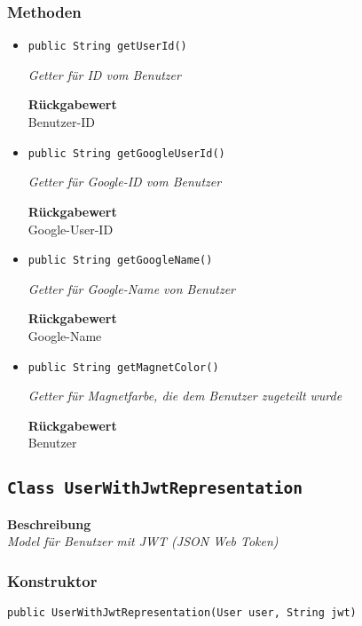     \subsubsection{Methoden}
    \begin{itemize}
    	\item{\texttt{public String getUserId()}}
    	
    	\textit{Getter für ID vom Benutzer}
    	
    	
    	
    	\textbf{Rückgabewert} \\
    	Benutzer-ID        \item{\texttt{public String getGoogleUserId()}}
    	
    	\textit{Getter für Google-ID vom Benutzer}
    	
    	
    	
    	\textbf{Rückgabewert} \\
    	Google-User-ID        \item{\texttt{public String getGoogleName()}}
    	
    	\textit{Getter für Google-Name von Benutzer}
    	
    	
    	
    	\textbf{Rückgabewert} \\
    	Google-Name        \item{\texttt{public String getMagnetColor()}}
    	
    	\textit{Getter für Magnetfarbe, die dem Benutzer zugeteilt wurde}
    	
    	
    	
    	\textbf{Rückgabewert} \\
    	Benutzer
    \end{itemize}
    \subsection{\texttt{Class UserWithJwtRepresentation}}
    \textbf{Beschreibung} \\
    \textit{Model für Benutzer mit JWT (JSON Web Token)}
    \subsubsection{Konstruktor}
    \texttt{public UserWithJwtRepresentation(User user, String jwt)}
